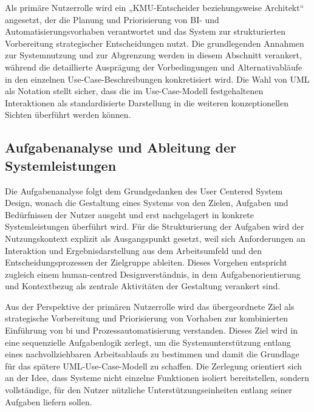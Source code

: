 Als primäre Nutzerrolle wird ein „KMU-Entscheider beziehungsweise Architekt“ angesetzt, der die Planung und Priorisierung von BI- und Automatisierungsvorhaben verantwortet und das System zur strukturierten Vorbereitung strategischer Entscheidungen nutzt. \cite{norman_draper1986}
Die grundlegenden Annahmen zur Systemnutzung und zur Abgrenzung werden in diesem Abschnitt verankert, während die detaillierte Ausprägung der Vorbedingungen und Alternativabläufe in den einzelnen Use-Case-Beschreibungen konkretisiert wird. \cite{jacobson2024_usecase3}
Die Wahl von UML als Notation stellt sicher, dass die im Use-Case-Modell festgehaltenen Interaktionen als standardisierte Darstellung in die weiteren konzeptionellen Sichten überführt werden können. \cite{omg2017_uml251_about}


\subsection{Aufgabenanalyse und Ableitung der Systemleistungen}
Die Aufgabenanalyse folgt dem Grundgedanken des User Centered System Design, wonach die Gestaltung eines Systems von den Zielen, Aufgaben und Bedürfnissen der Nutzer ausgeht und erst nachgelagert in konkrete Systemleistungen überführt wird. \cite{normanDraper1986}
Für die Strukturierung der Aufgaben wird der Nutzungskontext explizit als Ausgangspunkt gesetzt, weil sich Anforderungen an Interaktion und Ergebnisdarstellung aus dem Arbeitsumfeld und den Entscheidungsprozessen der Zielgruppe ableiten. \cite{normanDraper1986}
Dieses Vorgehen entspricht zugleich einem human-centred Designverständnis, in dem Aufgabenorientierung und Kontextbezug als zentrale Aktivitäten der Gestaltung verankert sind. \cite{iso9241_210_2019}

Aus der Perspektive der primären Nutzerrolle wird das übergeordnete Ziel als strategische Vorbereitung und Priorisierung von Vorhaben zur kombinierten Einführung von \gls{bi} und Prozessautomatisierung verstanden.
Dieses Ziel wird in eine sequenzielle Aufgabenlogik zerlegt, um die Systemunterstützung entlang eines nachvollziehbaren Arbeitsablaufs zu bestimmen und damit die Grundlage für das spätere UML-Use-Case-Modell zu schaffen. \cite{normanDraper1986}
Die Zerlegung orientiert sich an der Idee, dass Systeme nicht einzelne Funktionen isoliert bereitstellen, sondern vollständige, für den Nutzer nützliche Unterstützungseinheiten entlang seiner Aufgaben liefern sollen. \cite{iso9241_210_2019}

